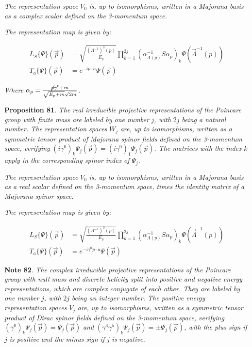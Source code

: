 \documentclass[11pt]{book}
\begin{document}
\emph{The representation space }\(V_0\)\emph{ is, up to isomorphisms,
written in a Majorana basis as a complex scalar defined on the
3-momentum space.}

\emph{The representation map is given by: }

\begin{equation}\begin{aligned}
L_S\{\Psi\}(\vec{p})&=\sqrt{\frac{(\Lambda^{-1})^0(p)}{E_p}}\prod_{k=1}^{2j}(\alpha^{-1}_{\Lambda(p)}S\alpha_p)_k\Psi(\vec{\Lambda}^{-1}(p))\\
T_a\{\Psi\}(\vec{p})&=e^{-i p\cdot a}\Psi(\vec{p})\end{aligned}\end{equation}

\emph{ Where
}\(\alpha_p=\frac{\cancel p\gamma^0+m}{\sqrt{E_p+m}\sqrt{2m}}\)\emph{.}

\textbf{Proposition 81}. \emph{The real irreducible projective
representations of the Poincare group with finite mass are labeled by
one number }\(j\)\emph{, with }\(2j\)\emph{ being a natural number. The
representation spaces }\(W_j\)\emph{ are, up to isomorphisms, written as
a symmetric tensor product of Majorana spinor fields defined on the
3-momentum space, verifying
}\((i\gamma^0)_k\Psi_j(\vec{p})=(i\gamma^0)_1\Psi_j(\vec{p})\)\emph{.
The matrices with the index }\(k\)\emph{ apply in the corresponding
spinor index of }\(\Psi_j\)\emph{.}

\emph{The representation space }\(V_0\)\emph{ is, up to isomorphisms,
written in a Majorana basis as a real scalar defined on the 3-momentum
space, times the identity matrix of a Majorana spinor space.}

\emph{The representation map is given by: }

\begin{equation}\begin{aligned}
L_S\{\Psi\}(\vec{p})&=\sqrt{\frac{(\Lambda^{-1})^0(p)}{E_p}}\prod_{k=1}^{2j}(\alpha^{-1}_{\Lambda(p)}S\alpha_p)_k\Psi(\vec{\Lambda}^{-1}(p))\\
T_a\{\Psi\}(\vec{p})&=e^{-i\gamma^0 p\cdot a}\Psi(\vec{p})\end{aligned}\end{equation}

\textbf{Note 82}. \emph{The complex irreducible projective
representations of the Poincare group with null mass and discrete
helicity split into positive and negative energy representations, which
are complex conjugate of each other. They are labeled by one number
}\(j\)\emph{, with }\(2j\)\emph{ being an integer number. The positive
energy representation spaces }\(V_j\)\emph{ are, up to isomorphisms,
written as a symmetric tensor product of Dirac spinor fields defined on
the 3-momentum space, verifying
}\((\gamma^0)_k\Psi_j(\vec{p})=\Psi_j(\vec{p})\)\emph{ and
}\((\gamma^3\gamma^5)_k\Psi_j(\vec{p})=\pm \Psi_j(\vec{p})\)\emph{, with
the plus sign if }\(j\)\emph{ is positive and the minus sign if
}\(j\)\emph{ is negative.}
\end{document}
